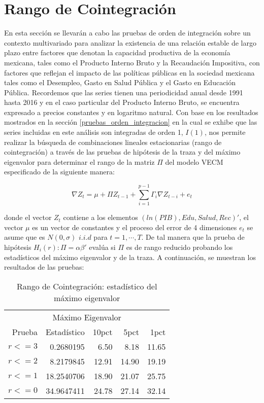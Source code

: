

\section{Rango de Cointegración}\label{chap:rank}


En esta sección se llevarán a cabo las pruebas de orden de integración sobre un contexto multivariado para analizar la existencia de una relación estable de largo plazo entre factores que denotan la capacidad productiva de la economía mexicana, tales como el Producto Interno Bruto y la Recaudación Impositiva, con factores que reflejan el impacto de las políticas públicas en la sociedad mexicana tales como el Desempleo, Gasto en Salud Pública y el Gasto en Educación Pública. Recordemos que las series tienen una periodicidad anual desde 1991 hasta 2016 y en el caso particular del Producto Interno Bruto, se encuentra expresado a precios constantes y en logaritmo natural. Con base en los resultados mostrados en la sección \ref{pruebas_orden_integracion} en la cual se exhibe que las series incluidas en este análisis son integradas de orden 1, $I(1)$, nos permite realizar la búsqueda de combinaciones lineales estacionarias (rango de cointegración) a través de las pruebas de hipótesis de la traza y del máximo eigenvalor para determinar el rango de la matriz $\Pi$ del modelo VECM especificado de la siguiente manera:


\begin{equation} 
	\nabla Z_t=  \mu +   \Pi{Z}_{t-1} + \sum_{i=1}^{p-1}\Gamma_i\nabla Z_{t-i} +  e_t
\end{equation}

donde el vector $Z_t$ contiene a los elementos $(ln(PIB), Edu, Salud, Rec)'$, el vector $\mu$ es un vector de constantes y el proceso del error de 4 dimensiones $e_t$ se asume que es $N(0,\sigma)$ $i.i.d$ para $t = 1, \cdots, T$. De tal manera que la prueba de hipótesis $H_i (r) : \Pi=\alpha\beta'$ evalúa si $\Pi$ es de rango reducido probando los estadísticos del máximo eigenvalor y de la traza. A continuación, se muestran los resultados de las pruebas: \bigskip


\begin{table}[H]
\begin{center}
    \begin{tabular}{rrrrr}
    \hline
    \multicolumn{5}{c}{Máximo Eigenvalor} \\
        \cline{1-5}
        Prueba    		& Estadístico 		& 10pct 		& 5pct 		& 1pct \\
        \hline
        $r <= 3$		& 0.2680195		& 6.50		& 8.18		& 11.65    \\
        $r <= 2$		& 8.2179845		& 12.91		& 14.90		& 19.19    \\
        $r <= 1$		& 18.2540706		& 18.90		& 21.07		& 25.75   \\
        $r <= 0$		& 34.9647411		& 24.78		& 27.14		& 32.14   \\
        \hline
    \end{tabular}
\end{center}
\caption {Rango de Cointegración: estadístico del máximo eigenvalor} \label{tab:eigen} 
\end{table}


